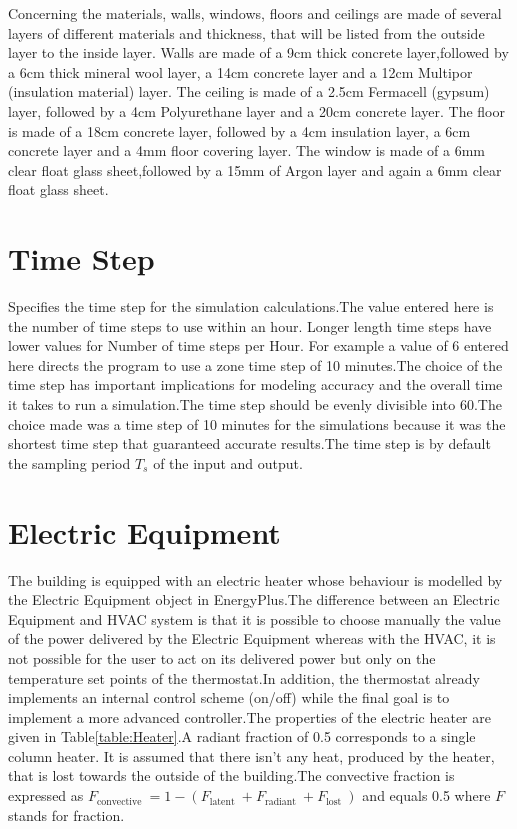 \documentclass[a4paper,12pt]{report}
\numberwithin{equation}{section}
\begin{document}
\noindent
Concerning the materials, walls, windows, floors and ceilings are made of several layers of different materials and thickness, that will be listed from the outside layer to the inside layer. Walls are made of a 9cm thick concrete layer,followed by a 6cm thick mineral wool layer, a 14cm concrete layer and a 12cm Multipor (insulation material) layer. The ceiling is made of a 2.5cm Fermacell (gypsum) layer, followed by a 4cm Polyurethane layer and a 20cm concrete layer.
The floor is made of a 18cm concrete layer, followed by a 4cm insulation layer, a 6cm concrete layer and a 4mm floor covering layer. The window is made of a 6mm clear float glass sheet,followed by a 15mm of Argon layer and again a 6mm clear float glass sheet.

\section{Time Step }
Specifies the  time step for the simulation calculations.The value entered here is the number of time steps to use within an hour. Longer length time steps have lower values for Number of time steps per Hour. For example a value of 6 entered here directs the program to use a zone time step of 10 minutes.The choice of the time step has important implications for modeling accuracy and the overall time it takes to run a simulation.The time step should be evenly divisible into 60.The choice made was a time step of 10 minutes for the simulations because it was the shortest time step that guaranteed accurate results.The time step is by default the sampling period $T_{s}$ of the input and output.

\section{Electric Equipment}
The building is equipped with an electric heater whose behaviour is modelled by the Electric Equipment object in EnergyPlus.The difference between an Electric Equipment and HVAC system is that it is possible to choose manually the value of the power delivered by the Electric Equipment
whereas with the HVAC, it is not possible for the user to act on its delivered power but only on the temperature set points of the thermostat.In addition, the thermostat already implements an internal control scheme (on/off) while the final goal is to implement a more advanced controller.The properties of the electric heater are given in Table\ref{table:Heater}.A radiant fraction of 0.5 corresponds to a single column heater. It is assumed that there isn’t any heat, produced by the heater, that is lost towards the outside of the building.The convective fraction is expressed as $F_{\text {convective }}=1-\left(F_{\text {latent }}+F_{\text {radiant }}+F_{\text {lost }}\right)$ and equals 0.5 where $F$ stands for fraction.
\end{document}
